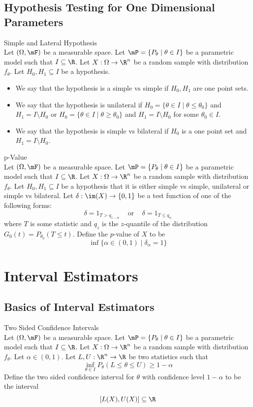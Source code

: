 \documentclass[a4paper]{article}
\begin{document}
\subsection{Hypothesis Testing for One Dimensional Parameters}
\begin{defn}{Simple and Lateral Hypothesis}{}\\
Let $(\Omega,\mF)$ be a measurable space. Let $\mP=\{P_\theta\;|\;\theta\in I\}$ be a parametric model such that $I\subseteq\R$. Let $X:\Omega\to\R^n$ be a random sample with distribution $f_\theta$. Let $H_0,H_1\subseteq I$ be a hypothesis. 
\begin{itemize}
\item We say that the hypothesis is a simple vs simple if $H_0,H_1$ are one point sets. 
\item We say that the hypothesis is unilateral if $H_0=\{\theta\in I\;|\;\theta\leq\theta_0\}$ and $H_1=I\setminus H_0$ or $H_0=\{\theta\in I\;|\;\theta\geq\theta_0\}$ and $H_1=I\setminus H_0$ for some $\theta_0\in I$. 
\item We say that the hypothesis is simple vs bilateral if $H_0$ is a one point set and $H_1=I\setminus H_0$. 
\end{itemize}
\end{defn}

\begin{defn}{p-Value}{}\\
Let $(\Omega,\mF)$ be a measurable space. Let $\mP=\{P_\theta\;|\;\theta\in I\}$ be a parametric model such that $I\subseteq\R$. Let $X:\Omega\to\R^n$ be a random sample with distribution $f_\theta$. Let $H_0,H_1\subseteq I$ be a hypothesis that it is either simple vs simple, unilateral or simple vs bilateral. Let $\delta:\im(X)\to\{0,1\}$ be a test function of one of the following forms: $$\delta=1_{T>q_{1-\alpha}}\;\;\;\text{ or }\;\;\;\delta=1_{T\leq q_\alpha}$$ where $T$ is some statistic and $q_z$ is the $z$-quantile of the distribution $G_0(t)=P_{\theta_0}(T\leq t)$. Define the $p$-value of $X$ to be $$\inf\{\alpha\in(0,1)\;|\;\delta_\alpha=1\}$$
\end{defn}

\pagebreak
\section{Interval Estimators}
\subsection{Basics of Interval Estimators}
\begin{defn}{Two Sided Confidence Intervals}{}\\
Let $(\Omega,\mF)$ be a measurable space. Let $\mP=\{P_\theta\;|\;\theta\in I\}$ be a parametric model such that $I\subseteq\R$. Let $X:\Omega\to\R^n$ be a random sample with distribution $f_\theta$. Let $\alpha\in(0,1)$. Let $L,U:\R^n\to\R$ be two statistics such that $$\inf_{\theta\in I}P_\theta(L\leq\theta\leq U)\geq 1-\alpha$$ Define the two sided confidence interval for $\theta$ with confidence level $1-\alpha$ to be the interval $$[L(X),U(X)]\subseteq\R$$
\end{defn}
\end{document}
